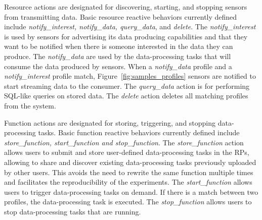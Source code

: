 Resource actions are designated for discovering, starting, and stopping sensors from transmitting data. Basic resource reactive behaviors currently defined include {\it notify\_interest, notify\_data, query\_data}, and {\it delete}. The {\it notify\_interest} is used by sensors for advertising its data producing capabilities and that they want to be notified when there is someone interested in the data they can produce. The {\it notify\_data} are used by the data-processing tasks that will consume the data produced by sensors. When a {\it notify\_data} profile and a {\it notify\_interest} profile match, Figure~\ref{fig:samples_profiles} sensors are notified to start streaming data to the consumer. The {\it query\_data } action is for performing SQL-like queries on stored data. The {\it delete} action deletes all matching profiles from the system.

Function actions are designated for storing, triggering, and stopping data-processing tasks. Basic function reactive behaviors currently defined include {\it store\_function, start\_function and stop\_function}. The {\it store\_function} action allows users to submit and store user-defined data-processing tasks in the RPs, allowing to share and discover existing data-processing tasks previously uploaded by other users. This avoids the need to rewrite the same function multiple times and facilitates the reproducibility of the experiments. The {\it start\_function} allows users to trigger data-processing tasks on demand. %
If there is a match between two profiles, the data-processing task is executed. The {\it stop\_function} allows users to stop data-processing tasks that are running. %

